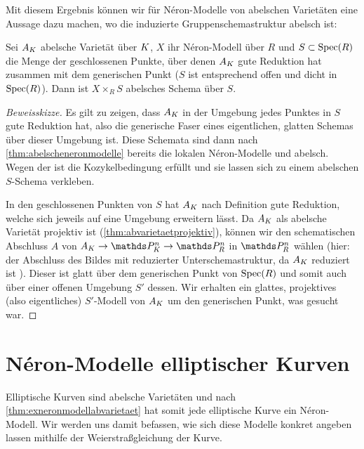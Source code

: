 \documentclass[german]{scrreprt}
\begin{document}
Mit diesem Ergebnis können wir für Néron-Modelle von
abelschen Varietäten eine Aussage dazu machen, wo die induzierte
Gruppenschemastruktur abelsch ist:
\begin{Satz}
  Sei $A_{K}$ abelsche Varietät über $K$,
  $X$ ihr Néron-Modell über $R$ und
  $S\subset\operatorname{Spec}(R)$ die Menge der geschlossenen Punkte, über denen
  $A_{K}$ gute Reduktion hat zusammen mit dem generischen Punkt
  ($S$ ist entsprechend offen und dicht in $\operatorname{Spec}(R)$).
  Dann ist $X\times_R S$ abelsches Schema über $S$.
  \cite[1.4, Theorem 3]{neron}
  \begin{proof}[Beweisskizze]
    Es gilt zu zeigen, dass $A_{K}$ in der Umgebung jedes Punktes in
    $S$ gute Reduktion hat, also die generische Faser eines
    eigentlichen, glatten Schemas über dieser Umgebung ist.
    Diese Schemata sind dann nach \autoref{thm:abelscheneronmodelle}
    bereits die lokalen Néron-Modelle und abelsch.
    Wegen der \NAbbEig ist die Kozykelbedingung
    erfüllt und sie lassen sich zu einem abelschen $S$-Schema
    verkleben.

    In den geschlossenen Punkten von $S$ hat $A_{K}$ nach Definition
    gute Reduktion, welche sich jeweils auf eine Umgebung erweitern
    lässt.
    Da $A_{K}$ als abelsche Varietät projektiv ist
    (\autoref{thm:abvarietaetprojektiv}), können wir den schematischen
    Abschluss $A$ von $A_\K\to\P_\K^n\to\P_R^n$ in $\P_R^n$ wählen
    (hier: der Abschluss des Bildes mit reduzierter
    Unterschemastruktur, da $A_{K}$ reduziert ist
    \cite[Remark 10.32]{wedhorn}).
    Dieser ist glatt über dem generischen Punkt von $\operatorname{Spec}(R)$
    und somit auch über einer offenen Umgebung $S'$ dessen.
    Wir erhalten ein glattes, projektives (also eigentliches)
    $S'$-Modell von $A_{K}$ um den generischen Punkt, was gesucht war.
  \end{proof}
\end{Satz}


\section{Néron-Modelle elliptischer Kurven}
Elliptische Kurven sind abelsche Varietäten und nach
\autoref{thm:exneronmodellabvarietaet} hat somit jede elliptische
Kurve ein Néron-Modell. Wir werden uns damit befassen, wie sich diese
Modelle konkret angeben lassen mithilfe der Weierstraßgleichung der
Kurve.
\end{document}
